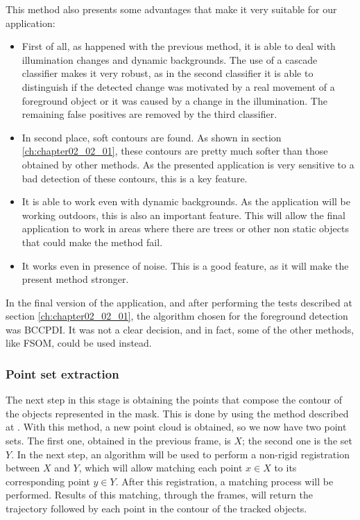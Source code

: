 \begin{itemize}
This method also presents some advantages that make it very suitable for our application:
\begin{itemize}
 \item First of all, as happened with the previous method, it is able to deal with illumination changes and dynamic backgrounds. The use of a cascade classifier makes it very robust, as in the second classifier it is able to distinguish if the detected change was motivated by a real movement of a foreground object or it was caused by a change in the illumination. The remaining false positives are removed by the third classifier.
 \item In second place, soft contours are found. As shown in section \ref{ch:chapter02_02_01}, these contours are pretty much softer than those obtained by other methods. As the presented application is very sensitive to a bad detection of these contours, this is a key feature.
 \item It is able to work even with dynamic backgrounds. As the application will be working outdoors, this is also an important feature. This will allow the final application to work in areas where there are trees or other non static objects that could make the method fail.
 \item It works even in presence of noise. This is a good feature, as it will make the present method stronger.
\end{itemize}
 
\end{itemize}

In the final version of the application, and after performing the tests described at section \ref{ch:chapter02_02_01}, the algorithm chosen for the foreground detection was BCCPDI. It was not a clear decision, and in fact, some of the other methods, like FSOM, could be used instead.

\subsubsection{Point set extraction}\label{ch:chapter02_01_01_02}

The next step in this stage is obtaining the points that compose the contour of the objects represented in the mask. This is done by using the method described at \cite{suzuki1985topological}. With this method, a new point cloud is obtained, so we now have two point sets. The first one, obtained in the previous frame, is $X$; the second one is the set $Y$. In the next step, an algorithm will be used to perform a non-rigid registration between $X$ and $Y$, which will allow matching each point $x \in X$ to its corresponding point $y \in Y$. After this registration, a matching process will be performed. Results of this matching, through the frames, will return the trajectory followed by each point in the contour of the tracked objects.

